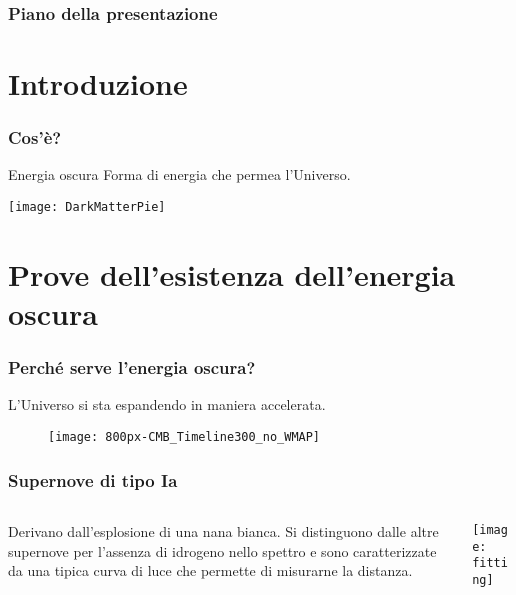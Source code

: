 \begin{frame}
  \maketitle
\end{frame}

\begin{frame}
  \frametitle{Piano della presentazione}
  \tableofcontents
\end{frame}

\section{Introduzione}

\begin{frame}
  \frametitle{Cos'è?}
  \begin{block}{Energia oscura}
    Forma di energia che permea l'Universo.
  \end{block}
  \texttt{[image: DarkMatterPie]}
\end{frame}

\section[Prove dell'esistenza]{Prove dell'esistenza dell'energia oscura}

\begin{frame}
  \frametitle{Perché serve l'energia oscura?}
  L'Universo si sta espandendo in maniera \alert{accelerata}.
  \begin{figure}
    \centering
    \texttt{[image: 800px-CMB\_Timeline300\_no\_WMAP]}
  \end{figure}
\end{frame}

\begin{frame}
  \frametitle{Supernove di tipo Ia}
  \begin{columns}
    \begin{column}{0.35\textwidth}
      Derivano dall'esplosione di una nana bianca. Si distinguono dalle altre
      supernove per l'assenza di idrogeno nello spettro e sono caratterizzate da
      una tipica curva di luce che permette di misurarne la distanza.
    \end{column}
    \begin{column}{0.6\textwidth}
      \texttt{[image: fitting]}
    \end{column}
  \end{columns}
\end{frame}

